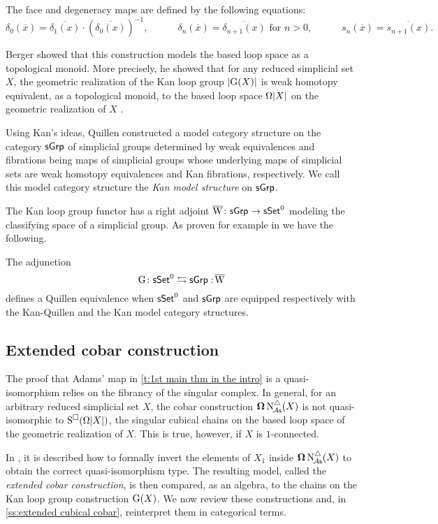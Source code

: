 The face and degeneracy maps are defined by the following equations:
\[
\delta_0(\overline{x}) = \overline{\delta_1(x)} \cdot (\overline{\delta_0(x)})^{-1}, \qquad \quad
\delta_n(\overline{x}) = \overline{\delta_{n+1}(x)} \text{ for } n>0, \qquad \quad
s_n(\overline{x}) = \overline{s_{n+1}(x)}.
\]

Berger showed that this construction models the based loop space as a topological monoid.
More precisely, he showed that for any reduced simplicial set $X$, the geometric realization of the Kan loop group $\lvert\operatorname{G}(X)\rvert$ is weak homotopy equivalent, as a topological monoid, to the based loop space $\Omega \lvert X\rvert$ on the geometric realization of $X$ \cite{berger1995loops}.

Using Kan's ideas, Quillen constructed a model category structure on the category $\mathsf{sGrp}$ of simplicial groups determined by
weak equivalences and fibrations being maps of simplicial groups whose underlying maps of simplicial sets are weak homotopy equivalences and Kan fibrations, respectively.
We call this model category structure the \textit{Kan model structure} on $\mathsf{sGrp}$.

The Kan loop group functor has a right adjoint $\operatorname{\overline{W}} \colon \mathsf{sGrp} \to \mathsf{sSet}^0$ modeling the classifying space of a simplicial group.
As proven for example in \cite[Chapter V]{goerss2009simplicial} we have the following.

\begin{proposition} \label{p:kan adjuntion}
	The adjunction
	\[
	\operatorname{G} \colon \mathsf{sSet}^0 \leftrightarrows \mathsf{sGrp} :\! \operatorname{\overline{W}}
	\]
	defines a Quillen equivalence when $\mathsf{sSet}^0$ and $\mathsf{sGrp}$ are equipped respectively with the Kan-Quillen and the Kan model category structures.
\end{proposition}

\subsection{Extended cobar construction}

The proof that Adams' map in \cref{t:1st main thm in the intro} is a quasi-isomorphism relies on the fibrancy of the singular complex.
In general, for an arbitrary reduced simplicial set $X$, the cobar construction $\operatorname{\mathbf{\Omega}} \operatorname{N^{\triangle}_{\!{\mathcal{A}\mathsf{s}}}}(X)$ is not quasi-isomorphic to $\operatorname{S^{\square}}(\Omega|X|)$, the singular cubical chains on the based loop space of the geometric realization of $X$.
This is true, however, if $X$ is $1$-connected.

In \cite{hess2010cobar}, it is described how to formally invert the elements of $X_1$ inside $\operatorname{\mathbf{\Omega}} \operatorname{N^{\triangle}_{\!{\mathcal{A}\mathsf{s}}}}(X)$ to obtain the correct quasi-isomorphism type.
The resulting model, called the \textit{extended cobar construction}, is then compared, as an algebra, to the chains on the Kan loop group construction $\operatorname{G}(X)$.
We now review these constructions and, in \cref{ss:extended cubical cobar}, reinterpret them in categorical terms.

